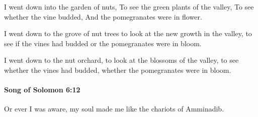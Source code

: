			\begin{versebox}
					\item[BHS] 
					\item[LXX] 
					\item[ASV] I went down into the garden of nuts, To see the green plants of the valley, To see whether the vine budded, And the pomegranates were in flower.
					\item[NIV] I went down to the grove of nut trees to look at the new growth in the valley, to see if the vines had budded or the pomegranates were in bloom.
					\item[NRSV] I went down to the nut orchard, to look at the blossoms of the valley, to see whether the vines had budded, whether the pomegranates were in bloom.
			\end{versebox}

		\paragraph{Song of Solomon 6:12} %
			\label{SONGOFSOLOMON-6-12}

			Or ever I was aware, my soul made me like the chariots of Amminadib.

